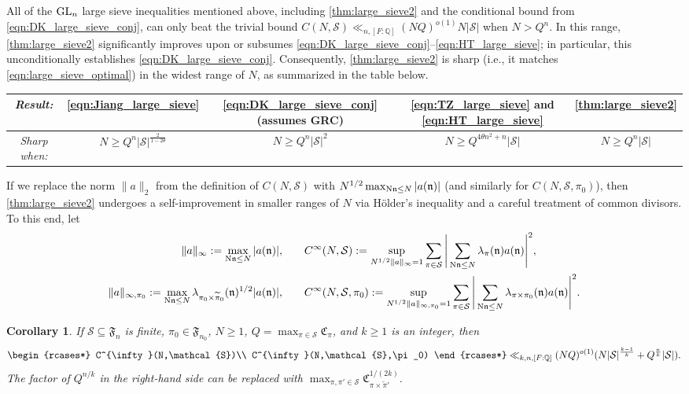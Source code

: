 \documentclass[11pt]{amsart}
\newtheorem{corollary}[theorem]{Corollary}
\theoremstyle{remark}
\numberwithin{equation}{section}
\newcommand{\kn}{\mathfrak{n}}
\newcommand{\N}{\textnormal{N}}
\newcommand{\Q}{\mathbb{Q}}
\newcommand{\mS}{\mathcal{S}}
\newcommand{\GL}{\textnormal{GL}}
\renewcommand{\tilde}{\widetilde}
\begin{document}
All of the $\GL_n$ large sieve inequalities mentioned above, including \cref{thm:large_sieve2} and the conditional bound from \eqref{eqn:DK_large_sieve_conj}, can only beat the trivial bound $C(N, \mS) \ll_{n,[F:\Q]} (NQ)^{o(1)} N|\mS|$ when $N > Q^n$. In this range, \cref{thm:large_sieve2} significantly improves upon or subsumes \eqref{eqn:DK_large_sieve_conj}--\eqref{eqn:HT_large_sieve}; in particular, this unconditionally establishes \eqref{eqn:DK_large_sieve_conj}. Consequently, \cref{thm:large_sieve2} is sharp (i.e., it matches \eqref{eqn:large_sieve_optimal}) in the widest range of $N$, as summarized in the table below.

\begin{center}
\begin{tabular}{c|c|c|c|c}
    \emph{Result:} & \eqref{eqn:Jiang_large_sieve} & \eqref{eqn:DK_large_sieve_conj} (assumes GRC) & \eqref{eqn:TZ_large_sieve} and \eqref{eqn:HT_large_sieve} & \cref{thm:large_sieve2} 
    \\
    \hline
    \emph{Sharp when:}
    & 
    $N \ge Q^n |\mS|^{\frac{2}{1-2\theta}}$
    & 
    $N \ge Q^n |\mS|^2$
    & 
    $N \ge Q^{4\theta n^2+n}|\mS|$
    & 
    $N \ge Q^n |\mS|$
\end{tabular}
\end{center}

If we replace the norm $\|a\|_2$ from the definition of $C(N, \mS)$ with $N^{1/2}\max_{\N\kn\leq N} |a(\kn)|$ (and similarly for $C(N, \mS, \pi_0)$), then \cref{thm:large_sieve2} undergoes a self-improvement in smaller ranges of $N$ via H{\"o}lder's inequality and a careful treatment of common divisors. To this end, let
\begin{equation*}
\begin{aligned}
\|a\|_{\infty}:=\max_{\N\kn\leq N} |a(\kn)|, \qquad 
&C^\infty(N,\mathcal{S}):=\sup_{N^{1/2} \|a\|_{\infty}=1}\sum_{\pi\in\mathcal{S}}\Bigg|\sum_{\N\kn\leq N}\lambda_{\pi}(\kn)a(\kn)\Bigg|^2,
\\
\|a\|_{\infty,\pi_0}:=\max_{\N\kn\leq N}\lambda_{\pi_0\times\widetilde{\pi}_0}(\kn)^{1/2} |a(\kn)|, \qquad 
&C^\infty(N,\mathcal{S},\pi_0):=\sup_{N^{1/2} \|a\|_{\infty,\pi_0}=1}\sum_{\pi\in\mathcal{S}}\Bigg|\sum_{\N\kn\leq N}\lambda_{\pi\times\pi_0}(\kn)a(\kn)\Bigg|^2.
\end{aligned}
\end{equation*}

\begin{corollary}
\label{cor:large_sieve2}
If $\mathcal{S}\subseteq \mathfrak{F}_n$ is finite, $\pi_0\in\mathfrak{F}_{n_0}$, $N\geq 1$, $Q=\max_{\pi\in\mathcal{S}}\mathfrak{C}_{\pi}$, and $k\geq 1$ is an integer, then
\begin{equation}
\label{eqn:cor-large-sieve2}
\begin{rcases*}
C^{\infty}(N,\mathcal{S})\\
C^{\infty}(N,\mathcal{S},\pi_0)
\end{rcases*}\ll_{k,n,[F:\Q]} (NQ)^{o(1)}(N|\mathcal{S}|^{\frac{k-1}{k}}+Q^{\frac{n}{k}}|\mathcal{S}|).
\end{equation}
The factor of $Q^{n/k}$ in the right-hand side can be replaced with $\max_{\pi,\pi'\in\mathcal{S}}\mathfrak{C}_{\pi\times\tilde{\pi}'}^{1/(2k)}$.
\end{corollary}
\end{document}
